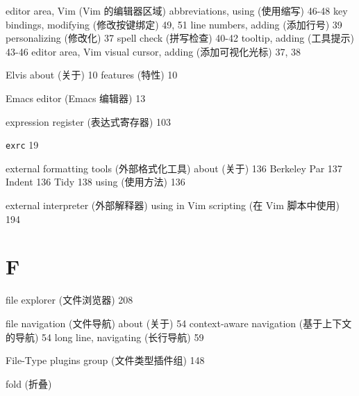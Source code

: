 editor area, Vim (Vim 的编辑器区域)
  abbreviations, using (使用缩写) 46-48
  key bindings, modifying (修改按键绑定) 49, 51
  line numbers, adding (添加行号) 39
  personalizing (修改化) 37
  spell check (拼写检查) 40-42
  tooltip, adding (工具提示) 43-46
  editor area, Vim visual cursor, adding (添加可视化光标) 37, 38

Elvis
  about (关于) 10
  features (特性) 10

Emacs editor (Emacs 编辑器) 13

expression register (表达式寄存器) 103

\texttt{exrc} 19

external formatting tools (外部格式化工具)
  about (关于) 136
  Berkeley Par 137
  Indent 136
  Tidy 138
  using (使用方法) 136

external interpreter (外部解释器)
  using in Vim scripting (在 Vim 脚本中使用) 194

\section{F}

file explorer (文件浏览器) 208

file navigation (文件导航)
  about (关于) 54
  context-aware navigation (基于上下文的导航) 54
  long line, navigating (长行导航) 59

File-Type plugins group (文件类型插件组) 148

fold (折叠)
